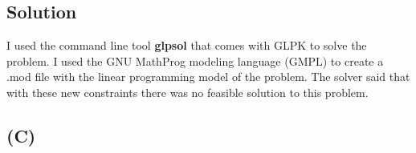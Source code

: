 \documentclass[12pt]{article}
\begin{document}
\subsection*{Solution}
I used the command line tool \textbf{glpsol} that comes with GLPK to solve the problem.  I used the GNU MathProg modeling language (GMPL) to create a .mod file with the linear programming model of the problem.  The solver said that with these new constraints there was no feasible solution to this problem.

\subsection*{(C)}

\newpage








\end{document}
